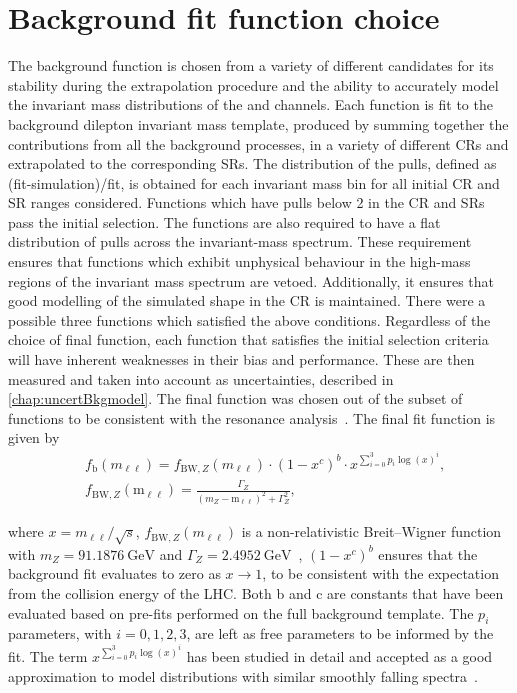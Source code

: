 \section{Background fit function choice}\label{sec:modelchoice}
The background function is chosen from a variety of different candidates for its stability during the extrapolation procedure and the ability to accurately model the invariant mass distributions of the \ee and \mumu channels. Each function is fit to the background dilepton invariant mass template, produced by summing together the contributions from all the background processes, in a variety of different CRs and extrapolated to the corresponding SRs. The distribution of the pulls, defined as (fit-simulation)/fit, is obtained for each invariant mass bin for all initial CR and SR ranges considered. Functions which have pulls below 2 in the CR and SRs pass the initial selection. The functions are also required to have a flat distribution of pulls across the invariant-mass spectrum. These requirement ensures that functions which exhibit unphysical behaviour in the high-mass regions of the invariant mass spectrum are vetoed. Additionally, it ensures that good modelling of the simulated shape in the CR is maintained. There were a possible three functions which satisfied the above conditions. Regardless of the choice of final function, each function that satisfies the initial selection criteria will have inherent weaknesses in their bias and performance. These are then measured and taken into account as uncertainties, described in \cref{chap:uncertBkgmodel}. The final function was chosen out of the subset of functions to be consistent with the resonance analysis~\cite{Aad:2019fac}. The final fit function is given by
\begin{equation}
    \label{eq:fitfunc}
    \begin{aligned}
        & f_\textrm{b}(m_{\ell\ell}) = f_{\mathrm{BW},Z}(m_{\ell\ell}) \cdot \left(1 - x^{c}\right)^{b} \cdot x^{\sum_{i=0}^3 p_i\log(x)^i}, \\
        & f_{\mathrm{BW},Z}(\mathrm{m_{\ell\ell}}) = \frac{\Gamma_Z}{(m_Z - \mathrm{m_{\ell\ell}})^2 + \Gamma_Z^2},
    \end{aligned}
\end{equation}

where $x = m_{\ell\ell}/\sqrt{s}$, $f_{\mathrm{BW},Z}(m_{\ell\ell})$ is a non-relativistic Breit--Wigner function with $m_Z = \SI{91.1876}{\giga\electronvolt}$ and $\Gamma_Z = \SI{2.4952}{\giga\electronvolt}$~\cite{PhysRevD.98.030001}, $(1 - x^{c})^b$ ensures that the background fit evaluates to zero as $x \to 1$, to be consistent with the expectation from the collision energy of the LHC. Both b and c are constants that have been evaluated based on pre-fits performed on the full background template. The $p_i$ parameters, with $i = 0,1,2,3$, are left as free parameters to be informed by the fit. The term $x^{\sum_{i=0}^3 p_i\log(x)^i}$ has been studied in detail and accepted as a good approximation to model distributions with similar smoothly falling spectra~\cite{Aad:2019fac,Aaboud:2016tru,Aaboud:2017yyg}.

